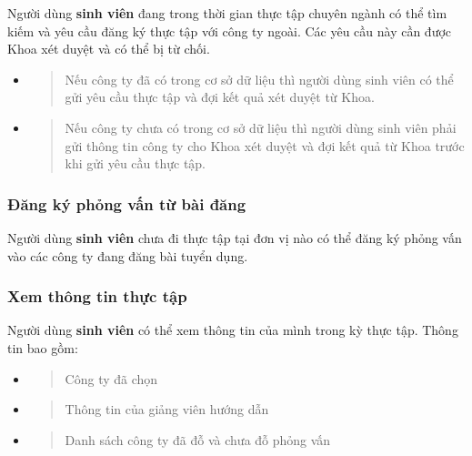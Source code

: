 \documentclass[./../main.tex]{subfiles}
\begin{document}
  Người dùng \textbf{sinh viên} đang trong thời gian thực tập chuyên ngành
  có thể tìm kiếm và yêu cầu đăng ký thực tập với công ty ngoài. Các yêu
  cầu này cần được Khoa xét duyệt và có thể bị từ chối.
  
  \begin{itemize}
  \item
    \begin{quote}
    Nếu công ty đã có trong cơ sở dữ liệu thì người dùng sinh viên có thể
    gửi yêu cầu thực tập và đợi kết quả xét duyệt từ Khoa.
    \end{quote}
  \item
    \begin{quote}
    Nếu công ty chưa có trong cơ sở dữ liệu thì người dùng sinh viên phải
    gửi thông tin công ty cho Khoa xét duyệt và đợi kết quả từ Khoa trước
    khi gửi yêu cầu thực tập.
    \end{quote}
  \end{itemize}
  
  \hypertarget{ux111ux103ng-kuxfd-phux1ecfng-vux1ea5n-tux1eeb-buxe0i-ux111ux103ng}{%
  \subsubsection{Đăng ký phỏng vấn từ bài
  đăng}\label{ux111ux103ng-kuxfd-phux1ecfng-vux1ea5n-tux1eeb-buxe0i-ux111ux103ng}}
  
  Người dùng \textbf{sinh viên} chưa đi thực tập tại đơn vị nào có thể
  đăng ký phỏng vấn vào các công ty đang đăng bài tuyển dụng.
  
  \hypertarget{xem-thuxf4ng-tin-thux1ef1c-tux1eadp}{%
  \subsubsection{Xem thông tin thực
  tập}\label{xem-thuxf4ng-tin-thux1ef1c-tux1eadp}}
  
  Người dùng \textbf{sinh viên} có thể xem thông tin của mình trong kỳ
  thực tập. Thông tin bao gồm:
  
  \begin{itemize}
  \item
    \begin{quote}
    Công ty đã chọn
    \end{quote}
  \item
    \begin{quote}
    Thông tin của giảng viên hướng dẫn
    \end{quote}
  \item
    \begin{quote}
    Danh sách công ty đã đỗ và chưa đỗ phỏng vấn
    \end{quote}
  \end{itemize}
  
\end{document}
